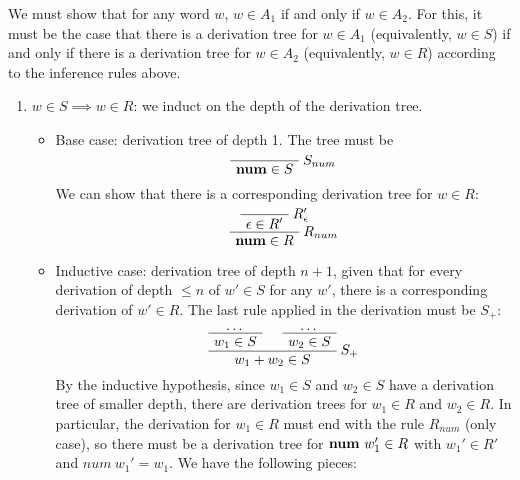 \begin{exercise}{}
\begin{solution}
\begin{enumerate}
      We must show that for any word \(w\), \(w \in A_1\) if and only if \(w \in
      A_2\). For this, it must be the case that there is a derivation tree for
      \(w \in A_1\) (equivalently, \(w \in S\)) if and only if there is a
      derivation tree for \(w \in A_2\) (equivalently, \(w \in R\)) according to
      the inference rules above.
      \begin{enumerate}
        \item \(w \in S \implies w \in R\): we induct on the depth of the
        derivation tree. 
        \begin{itemize}
          \item Base case: derivation tree of depth 1. The tree must be
          \begin{gather*}
            \AxiomC{}
            \RightLabel{\(S_{num}\)}
            \UnaryInfC{\(\num \in S\)}
            \DisplayProof
          \end{gather*}
          We can show that there is a corresponding derivation tree for \(w \in R\):
          \begin{gather*}
            \AxiomC{}
            \RightLabel{\(R'_{\epsilon}\)}
            \UnaryInfC{\(\epsilon \in R'\)}
            \RightLabel{\(R_{num}\)}
            \UnaryInfC{\(\num \in R\)}
            \DisplayProof
          \end{gather*}
          \item Inductive case: derivation tree of depth \(n+1\), given that for
          every derivation of depth \( \le n\) of \(w' \in S\) for any \(w'\), there
          is a corresponding derivation of \(w' \in R\). The last rule applied
          in the derivation must be \(S_+\):
          \begin{gather*}
            \AxiomC{\ldots}
            \UnaryInfC{\(w_1 \in S\)}
            \AxiomC{\ldots}
            \UnaryInfC{\(w_2 \in S\)}
            \RightLabel{\(S_+\)}
            \BinaryInfC{\(w_1 + w_2 \in S\)}
            \DisplayProof
          \end{gather*}
          By the inductive hypothesis, since \(w_1 \in S\) and \(w_2 \in S\)
          have a derivation tree of smaller depth, there are derivation trees
          for \(w_1 \in R\) and \(w_2 \in R\). In particular, the derivation for
          \(w_1 \in R\) must end with the rule \(R_{num}\) (only case), so there
          must be a derivation tree for \(\mathbf{num} ~w_1' \in R\) with \(w_1' \in
          R'\) and \(num~w_1' = w_1\). We have the following pieces:
          \begin{gather*}

\end{gather*}
\end{itemize}
\end{enumerate}
\end{enumerate}
\end{solution}
\end{exercise}
